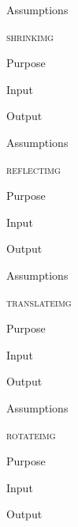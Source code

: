 \documentclass[pdftex, 11pt]{article}
\begin{document}
\begin{description}
\begin{description}
			\item{Assumptions}


		\end{description}



	\item{\textsc{shrinkimg}}
		\begin{description}
			\item{Purpose}


			\item{Input}


			\item{Output}


			\item{Assumptions}


		\end{description}



	\item{\textsc{reflectimg}}
		\begin{description}
			\item{Purpose}


			\item{Input}


			\item{Output}


			\item{Assumptions}


		\end{description}



	\item{\textsc{translateimg}}
		\begin{description}
			\item{Purpose}


			\item{Input}


			\item{Output}


			\item{Assumptions}


		\end{description}



	\item{\textsc{rotateimg}}
		\begin{description}
			\item{Purpose}


			\item{Input}


			\item{Output}



\end{description}
\end{description}
\end{document}
